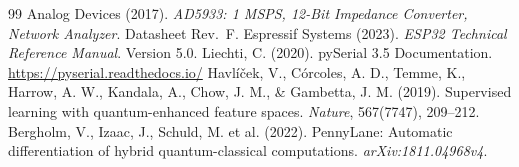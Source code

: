\documentclass[11pt,a4paper,spanish]{book}
\begin{document}
\begin{thebibliography}{99}
 Analog Devices (2017). \emph{AD5933: 1 MSPS, 12-Bit Impedance Converter, Network Analyzer}. Datasheet Rev.~F.
 Espressif Systems (2023). \emph{ESP32 Technical Reference Manual}. Version 5.0.
 Liechti, C. (2020). pySerial 3.5 Documentation. \url{https://pyserial.readthedocs.io/}
 Havl\'{i}\v{c}ek, V., C\'{o}rcoles, A. D., Temme, K., Harrow, A. W., Kandala, A., Chow, J. M., \& Gambetta, J. M. (2019). Supervised learning with quantum-enhanced feature spaces. \emph{Nature}, 567(7747), 209--212.
 Bergholm, V., Izaac, J., Schuld, M. et al. (2022). PennyLane: Automatic differentiation of hybrid quantum-classical computations. \emph{arXiv:1811.04968v4}.
\end{thebibliography}
\end{document}
